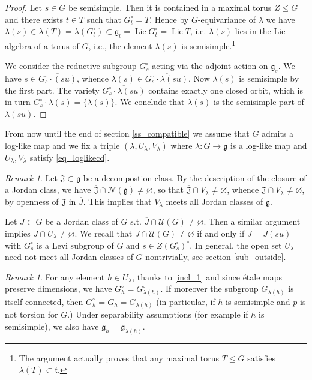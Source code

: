 \documentclass[12pt]{amsart}
\theoremstyle{definition}
\theoremstyle{remark}
\newtheorem{Remark}[Theorem]{Remark}
\newcommand{\g}{\mathfrak{g}}
\renewcommand{\t}{\mathfrak{t}}
\newcommand{\J}{\mathfrak{J}}
\newcommand{\N}{\mathcal{N}}
\newcommand{\U}{\mathcal{U}}
\newcommand{\Lie}{\operatorname{Lie}}
\begin{document}
\begin{proof}
Let $s \in G$ be semisimple.
Then it is contained in a maximal torus $Z \leq G$ and there exists $t \in T$ such that $G_t^\circ = T$.
Hence by $G$-equivariance of $\lambda$  we have
$\lambda(s) \in \lambda(T) = \lambda(G_t^\circ) \subset  \g_t = \Lie  G_t^\circ = \Lie T$, i.e. $\lambda(s)$ lies in the Lie algebra of a torus of $G$, i.e., the element $\lambda(s)$ is semisimple.\footnote{
The argument actually proves that any maximal torus $T \leq G$ satisfies $\lambda(T) \subset \t$.}  

We consider the reductive subgroup $G_s^\circ$ acting via the adjoint action on $\g_s$. 
We have $s \in \overline{G_s^\circ \cdot (su)}$, whence $\lambda(s) \in \overline{G_s^\circ \cdot \lambda(su)}$.
Now $\lambda(s)$ is semisimple by the first part.
The variety $\overline{G_s^\circ \cdot \lambda(su)} $  contains exactly one closed orbit, which is in turn $G_s^\circ \cdot \lambda(s) = \{\lambda(s)\}$.
We conclude that $\lambda(s)$ is the semisimple part of $\lambda(su)$.
\end{proof}

From now until the end of section \ref{ss_compatible} we assume that $G$ admits a log-like map and we fix a triple $(\lambda, U_\lambda, V_\lambda)$
where $\lambda \colon G \to \g$ is a log-like map and $U_\lambda, V_\lambda$ satisfy \eqref{eq_loglikecd}.

\begin{Remark}
Let $\J \subset \g$ be a decompostion class. 
By the description of the closure of a Jordan class, we have $\overline{\J} \cap \N(\g) \neq \varnothing$, so that $\overline{\J} \cap V_\lambda \neq \varnothing$, whence $\J \cap V_\lambda \neq \varnothing$, by openness of $\J$ in $\overline{J}$. 
This implies that $V_\lambda$ meets all Jordan classes of $\g$.

Let $J \subset G$ be a Jordan class of $G$ s.t. $\overline{J} \cap \U(G) \neq \varnothing$.
Then a similar argument implies $J \cap U_\lambda \neq \varnothing$.
We recall that $\overline{J} \cap \U(G) \neq \varnothing$ if and only if $J = J(su)$ with $G_s^\circ$ is a Levi subgroup of $G$ and $s \in Z(G_s^\circ)^\circ$.
In general, the open set $U_\lambda$ need not meet all Jordan classes of $G$ nontrivially, see section  \ref{sub_outside}.
\end{Remark}

\begin{Remark}\label{rk_etale}
For any element $h \in  U_\lambda$, thanks to  \eqref{incl_1} and since  \'etale maps preserve dimensions, we have $G_h^\circ = G_{\lambda(h)}^\circ$.
If moreover the subgroup $G_{\lambda(h)}$ is itself connected, then $G_h^\circ =G_h =   G_{\lambda(h)}$ (in particular, if $h$ is semisimple and $p$ is not torsion for $G$.)
Under separability assumptions (for example if $h$ is semisimple), we also have $\g_h = \g_{\lambda(h)}$.
\end{Remark}
\end{document}
